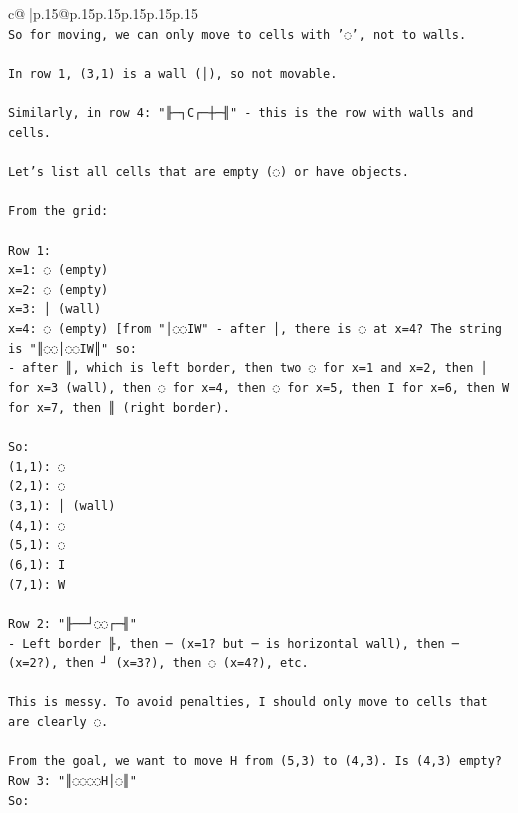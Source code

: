 \documentclass{article}
\begin{document}
{\begin{supertabular}{c@{$\;$}|p{.15\linewidth}@{}p{.15\linewidth}p{.15\linewidth}p{.15\linewidth}p{.15\linewidth}p{.15\linewidth}}
{{{\\ 
\texttt{So for moving, we can only move to cells with '◌', not to walls.} \\
\\ 
\texttt{In row 1, (3,1) is a wall (│), so not movable.} \\
\\ 
\texttt{Similarly, in row 4: "╟─┐C┌─┼─╢" {-} this is the row with walls and cells.} \\
\\ 
\texttt{Let's list all cells that are empty (◌) or have objects.} \\
\\ 
\texttt{From the grid:} \\
\\ 
\texttt{Row 1: } \\
\texttt{x=1: ◌ (empty)} \\
\texttt{x=2: ◌ (empty)} \\
\texttt{x=3: │ (wall)} \\
\texttt{x=4: ◌ (empty)  {[}from "│◌◌IW" {-} after │, there is ◌ at x=4? The string is "║◌◌│◌◌IW║" so:} \\
\texttt{{-} after ║, which is left border, then two ◌ for x=1 and x=2, then │ for x=3 (wall), then ◌ for x=4, then ◌ for x=5, then I for x=6, then W for x=7, then ║ (right border).} \\
\\ 
\texttt{So:} \\
\texttt{(1,1): ◌} \\
\texttt{(2,1): ◌} \\
\texttt{(3,1): │ (wall)} \\
\texttt{(4,1): ◌} \\
\texttt{(5,1): ◌} \\
\texttt{(6,1): I} \\
\texttt{(7,1): W} \\
\\ 
\texttt{Row 2: "╟──┘◌◌┌─╢"} \\
\texttt{{-} Left border ╟, then ─ (x=1? but ─ is horizontal wall), then ─ (x=2?), then ┘ (x=3?), then ◌ (x=4?), etc.} \\
\\ 
\texttt{This is messy. To avoid penalties, I should only move to cells that are clearly ◌.} \\
\\ 
\texttt{From the goal, we want to move H from (5,3) to (4,3). Is (4,3) empty? Row 3: "║◌◌◌◌H│◌║"} \\
\texttt{So:} \\
}}}
\end{supertabular}}
\end{document}
